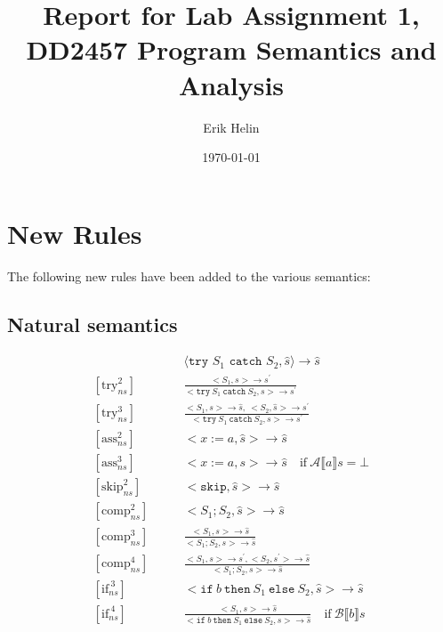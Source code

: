 \documentclass[11pt,oneside,a4paper]{article}
\newcommand{\NSConf}[2]{\langle #1, #2 \rangle}
\newcommand{\NSRule}[5]{[\text{#1}_{ns}^{#2}] \quad \quad & \NSConf{#3}{#4} \rightarrow #5}
\begin{document}
\title{Report for Lab Assignment 1, DD2457 Program Semantics and Analysis}
\author{Erik Helin}
\date{\today}
\maketitle
\newpage

\section*{New Rules}
The following new rules have been added to the various semantics:
\subsection*{Natural semantics}
\begingroup
\addtolength{\jot}{.5em}
\begin{align*}
\NSRule{try}{1}{\texttt{try } S_1 \texttt{ catch } S_2}{\hat{s}}{\hat{s}} \\
[\text{try}_{ns}^2] \quad \quad &
\frac{<S_1,s> \rightarrow s^{'}}
     {<\texttt{try}\: S_1 \: \texttt{catch} \: S_2, s> \rightarrow s^{'}}  \\
[\text{try}_{ns}^3] \quad \quad &
\frac{<S_1,s> \rightarrow \hat{s}, \: <S_2, \hat{s}> \rightarrow s^{'}}
     {<\texttt{try}\: S_1 \: \texttt{catch} \: S_2, s> \rightarrow s^{'}} \\
[\text{ass}_{ns}^2] \quad \quad &
<x := a, \hat{s}> \rightarrow \hat{s} \\
[\text{ass}_{ns}^3] \quad \quad &
<x := a, s> \rightarrow \hat{s} \quad 
\text{if} \: \mathcal{A} \llbracket a \rrbracket s = \bot \\
[\text{skip}_{ns}^2] \quad \quad &
<\texttt{skip}, \hat{s}> \rightarrow \hat{s} \\
[\text{comp}_{ns}^2] \quad \quad &
<S_1;S_2, \hat{s}> \rightarrow \hat{s} \\
[\text{comp}_{ns}^3] \quad \quad &
\frac{<S_1, s> \rightarrow \hat{s}}{<S_1;S_2, s> \rightarrow \hat{s}} \\
[\text{comp}_{ns}^4] \quad \quad &
\frac{<S_1, s> \rightarrow s^{'}, <S_2, s^{'}> \rightarrow \hat{s}}
{<S_1;S_2, s> \rightarrow \hat{s}} \\
[\text{if}_{ns}^{\:3}] \quad \quad & <\texttt{if}\:b\: \texttt{then}\:  S_1 \: 
\texttt{else} \: S_2, \hat{s}> \rightarrow \hat{s} \\
[\text{if}_{ns}^{\:4}] \quad \quad & \frac{<S_1, s> \rightarrow \hat{s}}
{ <\texttt{if}\:b\: \texttt{then}\:  S_1 \: \texttt{else} \: S_2, s> 
\rightarrow \hat{s}} \quad \text{if} \: \mathcal{B} \llbracket b \rrbracket s

\end{align*}
\end{document}
